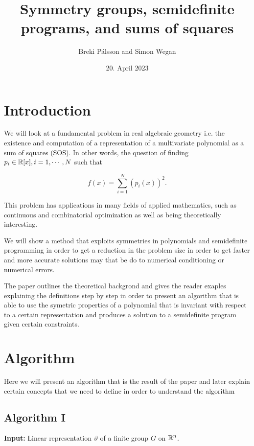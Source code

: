 \documentclass[]{article}
\begin{document}
\title{Symmetry groups, semidefinite programs, and sums of squares}
\author{Breki Pálsson and Simon Wegan}
\date{20. April 2023}

\maketitle

\section{Introduction}
We will look at a fundamental problem in real algebraic geometry i.e. the existence and computation of a
representation of a multivariate polynomial as a sum of squares (SOS). In other words, the
question of finding $p_i \in \mathbb R[x], i = 1, \cdots, N$ such that

\[f(x) = \sum_{i=1}^{N}(p_i(x))^2.\]

This problem has applications in many fields of applied mathematics, such as continuous and combinatorial optimization as well as being theoretically interesting. 


We will show a method that exploits symmetries in polynomials and semidefinite programming in order to get a reduction in the problem size in 
order to get faster and more accurate solutions may that be do to numerical conditioning or numerical errors.





The paper outlines the theoretical backgrond and gives the reader exaples explaining the definitions step by step in order to present an algorithm that is able to use the
symetric properties of a polynomial that is invariant with respect to a certain representation and produces a solution to a semidefinite program given certain constraints.


\section{Algorithm}
Here we will present an algorithm that is the result of the paper and later explain certain concepts that we need to define in order to understand the algorithm

\subsection*{Algorithm I}


\textbf{Input:} Linear representation $\vartheta$ of a finite group $G$ on $\mathbb R^n$.
\end{document}
